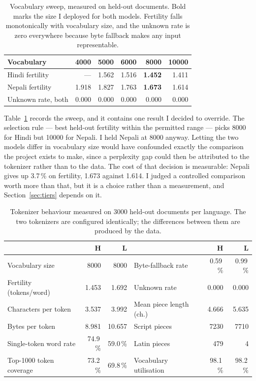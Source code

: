\documentclass[10pt,a4paper]{article}
\newcommand{\pc}[1]{#1\,\%}
\begin{document}
\begin{table}[htbp]
\centering\small
\begin{tabular}{@{}l r r r r r@{}}
\toprule
\textbf{Vocabulary} & \num{4000} & \num{5000} & \num{6000} & \num{8000} & \num{10000} \\
\midrule
Hindi fertility  & ---   & 1.562 & 1.516 & \textbf{1.452} & 1.411 \\
Nepali fertility & 1.918 & 1.827 & 1.763 & \textbf{1.673} & 1.614 \\
Unknown rate, both & 0.000 & 0.000 & 0.000 & 0.000 & 0.000 \\
\bottomrule
\end{tabular}
\caption{Vocabulary sweep, measured on held-out documents. Bold marks the size I deployed for both models. Fertility falls monotonically with vocabulary size, and the unknown rate is zero everywhere because byte fallback makes any input representable.}
\label{tab:sweep}
\end{table}

Table~\ref{tab:sweep} records the sweep, and it contains one result I decided to
override. The selection rule --- best held-out fertility within the permitted
range --- picks \num{8000} for Hindi but \num{10000} for Nepali. I held Nepali at
\num{8000} anyway. Letting the two models differ in vocabulary size would have
confounded exactly the comparison the project exists to make, since a perplexity
gap could then be attributed to the tokenizer rather than to the data. The cost
of that decision is measurable: Nepali gives up \pc{3.7} on fertility, 1.673
against 1.614. I judged a controlled comparison worth more than that, but it is a
choice rather than a measurement, and Section~\ref{sec:tiers} depends on it.

\begin{table}[htbp]
\centering\small
\caption{Tokenizer behaviour measured on \num{3000} held-out documents per language. The two tokenizers are configured identically; the differences between them are produced by the data.}
\label{tab:tok}
\begin{tabular}{@{}l r r@{\hskip 18pt} l r r@{}}
\toprule
 & \textbf{H} & \textbf{L} & & \textbf{H} & \textbf{L} \\
\midrule
Vocabulary size          & \num{8000} & \num{8000} & Byte-fallback rate      & \pc{0.59} & \pc{0.99} \\
Fertility (tokens/word)  & 1.453      & 1.692      & Unknown rate            & 0.000     & 0.000 \\
Characters per token     & 3.537      & 3.992      & Mean piece length (ch.) & 4.666     & 5.635 \\
Bytes per token          & 8.981      & 10.657     & Script pieces           & \num{7230} & \num{7710} \\
Single-token word rate   & \pc{74.9}  & \pc{59.0}  & Latin pieces            & \num{479} & \num{4} \\
Top-1000 token coverage  & \pc{73.2}  & \pc{69.8}  & Vocabulary utilisation  & \pc{98.1} & \pc{98.2} \\
\bottomrule
\end{tabular}
\end{table}
\end{document}
